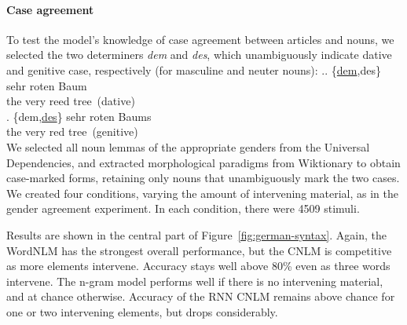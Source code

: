 \paragraph{Case agreement}
To test the model's knowledge of case agreement between articles and
nouns, we selected the two determiners \emph{dem} and \emph{des},
which unambiguously indicate dative and genitive case, respectively
(for masculine and neuter nouns): %
\ex.\ag. \{\underline{dem},des\} sehr roten Baum \\
the very reed tree\ (dative)\\
\bg. \{dem,\underline{des}\} sehr roten Baums \\
the very red tree\ (genitive) \\
%


We selected all noun lemmas of the
appropriate genders from the Universal Dependencies, and extracted
morphological paradigms from Wiktionary to obtain case-marked forms,
retaining only nouns that unambiguously mark the two cases.  We created
four conditions, varying the amount of intervening material, as in the
gender agreement experiment.
In each condition, there were 4509 stimuli.

Results are shown in the central part of Figure~\ref{fig:german-syntax}.  Again, the WordNLM has
the strongest overall performance, but the CNLM is competitive as more
elements intervene. Accuracy stays well above 80\% even as three
words intervene.  The n-gram model performs well if there is no
intervening material, and at chance otherwise.  Accuracy of the RNN
CNLM remains above chance for one or two intervening elements, but
drops considerably.

